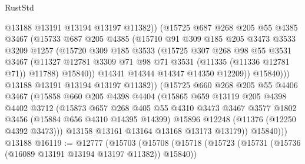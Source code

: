 \begin{lexlean}{RustStd}
\begin{coremodule}
{{{{{{{{{{{{{{{{{{{                    @13188
                    @13191
                    @13194
                    @13197
                    @11382))
                (@15725
                  @687
                  @268
                  @205
                  @55
                  @4385
                  @3467
                  (@15733
                    @687
                    @205
                    @4385
                    (@15710
                      @91
                      @309
                      @185
                      @205
                      @3473
                      @3533
                      @3209
                      @1257
                      (@15720
                        @309
                        @185
                        @3533
                        (@15725
                          @307
                          @268
                          @98
                          @55
                          @3531
                          @3467
                          (@11327
                            @12781
                            @3309
                            @71
                            @98
                            @71
                            @3531
                            (@11335 (@11336 @12781 @71))
                            @11788)
                          @15840))
                      @14341
                      @14344
                      @14347
                      @14350
                      @12209))
                  @15840)))
            @13188
            @13191
            @13194
            @13197
            @11382))
        (@15725
          @660
          @268
          @205
          @55
          @4406
          @3467
          (@15858
            @660
            @205
            @4398
            @4404
            (@15865
              @659
              @13119
              @205
              @4398
              @4402
              @3712
              (@15873
                @657
                @268
                @405
                @55
                @4310
                @3473
                @3467
                @3577
                @1802
                @3456
                (@15884 @656 @4310 @14395 @14399)
                @15896
                @12248
                (@11376 (@12250 @4392 @3473)))
              @13158
              @13161
              @13164
              @13168
              @13173
              @13179))
          @15840)))
    @13188
@16119 := @12777
    (@15703
      (@15708
        (@15718
          (@15723 (@15731 (@15736 (@16089 @13191 @13194 @13197 @11382)) @15840))
}}}}}}}}}}}}}}}}}}}
\end{coremodule}
\end{lexlean}
